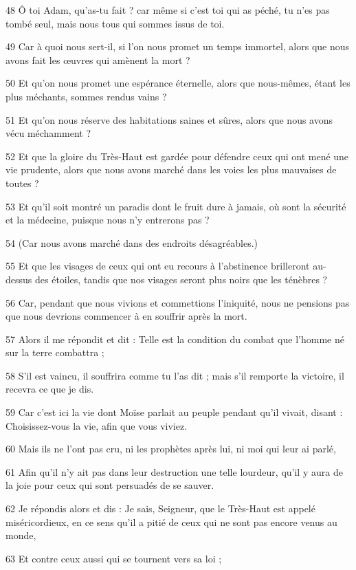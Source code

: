 \par 48 Ô toi Adam, qu'as-tu fait ? car même si c'est toi qui as péché, tu n'es pas tombé seul, mais nous tous qui sommes issus de toi.
\par 49 Car à quoi nous sert-il, si l'on nous promet un temps immortel, alors que nous avons fait les œuvres qui amènent la mort ?
\par 50 Et qu'on nous promet une espérance éternelle, alors que nous-mêmes, étant les plus méchants, sommes rendus vains ?
\par 51 Et qu'on nous réserve des habitations saines et sûres, alors que nous avons vécu méchamment ?
\par 52 Et que la gloire du Très-Haut est gardée pour défendre ceux qui ont mené une vie prudente, alors que nous avons marché dans les voies les plus mauvaises de toutes ?
\par 53 Et qu'il soit montré un paradis dont le fruit dure à jamais, où sont la sécurité et la médecine, puisque nous n'y entrerons pas ?
\par 54 (Car nous avons marché dans des endroits désagréables.)
\par 55 Et que les visages de ceux qui ont eu recours à l'abstinence brilleront au-dessus des étoiles, tandis que nos visages seront plus noirs que les ténèbres ?
\par 56 Car, pendant que nous vivions et commettions l'iniquité, nous ne pensions pas que nous devrions commencer à en souffrir après la mort.
\par 57 Alors il me répondit et dit : Telle est la condition du combat que l'homme né sur la terre combattra ;
\par 58 S'il est vaincu, il souffrira comme tu l'as dit ; mais s'il remporte la victoire, il recevra ce que je dis.
\par 59 Car c'est ici la vie dont Moïse parlait au peuple pendant qu'il vivait, disant : Choisissez-vous la vie, afin que vous viviez.
\par 60 Mais ils ne l'ont pas cru, ni les prophètes après lui, ni moi qui leur ai parlé,
\par 61 Afin qu'il n'y ait pas dans leur destruction une telle lourdeur, qu'il y aura de la joie pour ceux qui sont persuadés de se sauver.
\par 62 Je répondis alors et dis : Je sais, Seigneur, que le Très-Haut est appelé miséricordieux, en ce sens qu'il a pitié de ceux qui ne sont pas encore venus au monde,
\par 63 Et contre ceux aussi qui se tournent vers sa loi ;
